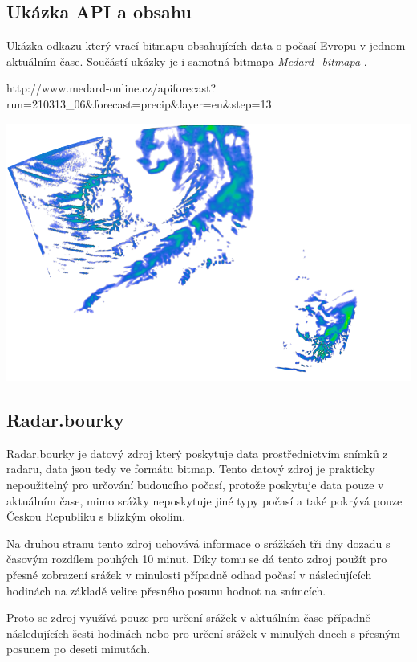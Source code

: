 \documentclass[czech,bachelor,dept460,male,csharp,cpdeclaration]{diploma}
\begin{document}
	\subsection{Ukázka API a obsahu}
	
	Ukázka odkazu který vrací bitmapu obsahujících data o počasí Evropu v jednom aktuálním čase. Součástí ukázky je i samotná bitmapa \emph{Medard\_bitmapa} \cite{medard}.
	
	http://www.medard-online.cz/apiforecast?run=210313\_06\&forecast=precip\&layer=eu\&step=13
	
	\begin{center}
		\includegraphics[scale=0.5]{Data/Mdrd_ukazka.png}
	\end{center}
	
	\subsection{Radar.bourky}
	
	Radar.bourky je datový zdroj který poskytuje data prostřednictvím snímků z radaru, data jsou tedy ve formátu bitmap. Tento datový zdroj je prakticky nepoužitelný pro určování budoucího počasí, protože poskytuje data pouze v aktuálním čase, mimo srážky neposkytuje jiné typy počasí a také pokrývá pouze Českou Republiku s blízkým okolím.
	
	Na druhou stranu tento zdroj uchovává informace o srážkách tři dny dozadu s časovým rozdílem pouhých 10 minut. Díky tomu se dá tento zdroj použít pro přesné zobrazení srážek v minulosti případně odhad počasí v následujících hodinách na základě velice přesného posunu hodnot na snímcích.
	
	Proto se zdroj využívá pouze pro určení srážek v aktuálním čase případně následujících šesti hodinách nebo pro určení srážek v minulých dnech s přesným posunem po deseti minutách.
	
\end{document}
